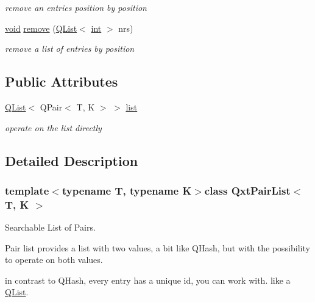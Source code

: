 \begin{DoxyCompactItemize}
\begin{DoxyCompactList}\small\item\em remove an entries position by position \end{DoxyCompactList}\item 
\hyperlink{group___u_a_v_objects_plugin_ga444cf2ff3f0ecbe028adce838d373f5c}{void} \hyperlink{class_qxt_pair_list_abed68c5367026b4a60a76548220a8332}{remove} (\hyperlink{class_q_list}{Q\-List}$<$ \hyperlink{ioapi_8h_a787fa3cf048117ba7123753c1e74fcd6}{int} $>$ nrs)
\begin{DoxyCompactList}\small\item\em remove a list of entries by position \end{DoxyCompactList}\end{DoxyCompactItemize}
\subsection*{Public Attributes}
\begin{DoxyCompactItemize}
\item 
\hyperlink{class_q_list}{Q\-List}$<$ Q\-Pair$<$ T, K $>$ $>$ \hyperlink{class_qxt_pair_list_a32478fa1f7b2f965d913b495de03c131}{list}
\begin{DoxyCompactList}\small\item\em operate on the list directly \end{DoxyCompactList}\end{DoxyCompactItemize}


\subsection{Detailed Description}
\subsubsection*{template$<$typename T, typename K$>$class Qxt\-Pair\-List$<$ T, K $>$}

Searchable List of Pairs. 

Pair list provides a list with two values, a bit like Q\-Hash, but with the possibility to operate on both values.

in contrast to Q\-Hash, every entry has a unique id, you can work with. like a \hyperlink{class_q_list}{Q\-List}.


